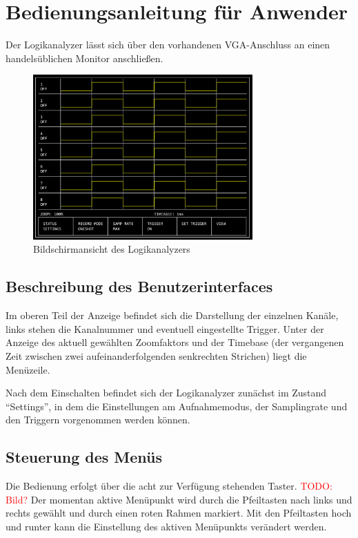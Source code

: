 \documentclass[IN,ngerman,utf8,12pt]{tumbook}
\newcommand\todo[1]{\textcolor{red}{TODO: #1}}
\begin{document}
\chapter{Bedienungsanleitung für Anwender}

Der Logikanalyzer lässt sich über den vorhandenen VGA-Anschluss an einen handelsüblichen Monitor anschließen.

\begin{figure}
    \centerline{
        \includegraphics[width=0.75\textwidth]{img/bildschirm}
    }
    \label{abb:bildschirm}
    \caption{Bildschirmansicht des Logikanalyzers}
\end{figure}

\section{Beschreibung des Benutzerinterfaces}

Im oberen Teil der Anzeige befindet sich die Darstellung der einzelnen Kanäle, links stehen die Kanalnummer und eventuell eingestellte Trigger.
Unter der Anzeige des aktuell gewählten Zoomfaktors und der Timebase (der vergangenen Zeit zwischen zwei aufeinanderfolgenden senkrechten Strichen) liegt die Menüzeile.

Nach dem Einschalten befindet sich der Logikanalyzer zunächst im Zustand ``Settings'', in dem die Einstellungen am Aufnahmemodus, der Samplingrate und den Triggern vorgenommen werden können.

\section{Steuerung des Menüs}

Die Bedienung erfolgt über die acht zur Verfügung stehenden Taster.
\todo{Bild?}
Der momentan aktive Menüpunkt wird durch die Pfeiltasten nach links und rechts gewählt und durch einen roten Rahmen markiert. Mit den Pfeiltasten hoch und runter kann die Einstellung des aktiven Menüpunkts verändert werden.
\end{document}
